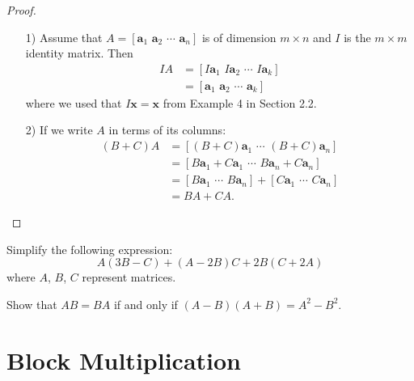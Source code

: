 \documentclass[20pt,a4paper]{extarticle}
\newcounter{example}[section]
\begin{document}
\begin{proof}
\begin{enumerate}
	\item[1)] Assume that $A = [\mathbf{a}_1 \, \, \mathbf{a}_2 \,\, \cdots \,\, \mathbf{a}_n ]$ is of dimension $m \times n$ and $I$ is the $m \times m$ identity matrix. Then
		\begin{align*}
			IA &= [I \mathbf{a}_1 \,\, I \mathbf{a}_2 \,\, \cdots \,\, I \mathbf{a}_k ] \\ 
			&= [\mathbf{a}_1 \,\, \mathbf{a}_2 \, \, \cdots \,\, \mathbf{a}_k ]
		\end{align*}
	where we used that $I \mathbf{x} = \mathbf{x}$ from Example 4 in Section 2.2.
	\item[2)] If we write $A$ in terms of its columns:
		\begin{align*}
		(B + C) A &= [ (B + C) \mathbf{a}_1 \,\,  \cdots \,\, (B + C) \mathbf{a}_n ] \\ 
		&= [ B \mathbf{a}_1 + C \mathbf{a}_1 \,\, \cdots \,\, B \mathbf{a}_n + C \mathbf{a}_n ] \\ 
		&= [B \mathbf{a}_1 \,\, \cdots \,\, B \mathbf{a}_n ] + [C \mathbf{a}_1 \,\, \cdots \,\, C\mathbf{a}_n ] \\ 
		&= BA + CA . \tag*{$\square$}
		\end{align*}
\end{enumerate}
\end{proof}

\newpage 

\begin{example}
Simplify the following expression:
	\[
		A(3B - C) + (A - 2B)C + 2B (C + 2A)
	\]
where $A$, $B$, $C$ represent matrices.
\end{example}

\begin{solution}

\end{solution}

\newpage 

\begin{example}
Show that $AB = BA$ if and only if $(A - B) (A + B) = A^2 - B^2$.
\end{example}

\begin{solution}

\end{solution}

\newpage 

\section{Block Multiplication}
\end{document}
